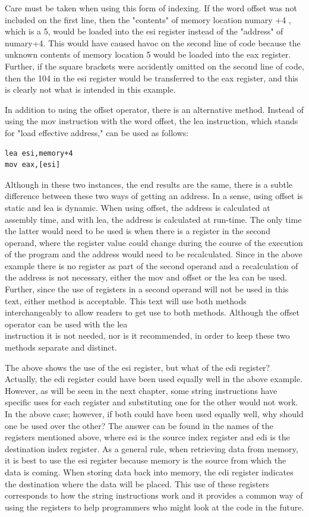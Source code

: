 \documentclass[10pt]{book}
\begin{document}
Care must be taken when using this form of indexing. If the word offset was not included on the first line, then the "contents" of memory location numary +4 , which is a 5, would be loaded into the esi register instead of the "address" of numary+4. This would have caused havoc on the second line of code because the unknown contents of memory location 5 would be loaded into the eax register. Further, if the square brackets were accidently omitted on the second line of code, then the 104 in the esi register would be transferred to the eax register, and this is clearly not what is intended in this example.

In addition to using the offset operator, there is an alternative method. Instead of using the mov instruction with the word offset, the lea instruction, which stands for "load effective address," can be used as follows:

\begin{verbatim}
lea esi,memory+4
mov eax,[esi]
\end{verbatim}

Although in these two instances, the end results are the same, there is a subtle difference between these two ways of getting an address. In a sense, using offset is static and lea is dynamic. When using offset, the address is calculated at assembly time, and with lea, the address is calculated at run-time. The only time the latter would need to be used is when there is a register in the second operand, where the register value could change during the course of the execution of the program and the address would need to be recalculated. Since in the above example there is no register as part of the second operand and a recalculation of the address is not necessary, either the mov and offset or the lea can be used. Further, since the use of registers in a second operand will not be used in this text, either method is acceptable. This text will use both methods interchangeably to allow readers to get use to both methods. Although the offset operator can be used with the lea\\
instruction it is not needed, nor is it recommended, in order to keep these two methods separate and distinct.

The above shows the use of the esi register, but what of the edi register? Actually, the edi register could have been used equally well in the above example. However, as will be seen in the next chapter, some string instructions have specific uses for each register and substituting one for the other would not work. In the above case; however, if both could have been used equally well, why should one be used over the other? The answer can be found in the names of the registers mentioned above, where esi is the source index register and edi is the destination index register. As a general rule, when retrieving data from memory, it is best to use the esi register because memory is the source from which the data is coming. When storing data back into memory, the edi register indicates the destination where the data will be placed. This use of these registers corresponds to how the string instructions work and it provides a common way of using the registers to help programmers who might look at the code in the future.
\end{document}
